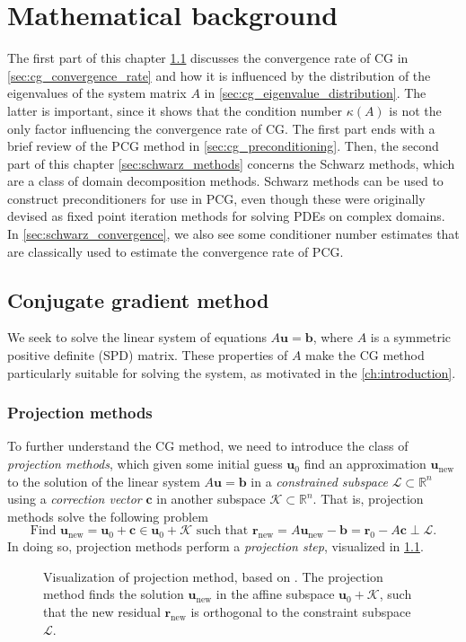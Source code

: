 \chapter{Mathematical background}\label{ch:background}
The first part of this chapter \cref{sec:cg_method} discusses the convergence rate of CG in \cref{sec:cg_convergence_rate} and how it is influenced by the distribution of the eigenvalues of the system matrix $A$ in \cref{sec:cg_eigenvalue_distribution}. The latter is important, since it shows that the condition number $\kappa(A)$ is not the only factor influencing the convergence rate of CG. The first part ends with a brief review of the PCG method in \cref{sec:cg_preconditioning}. Then, the second part of this chapter \cref{sec:schwarz_methods} concerns the Schwarz methods, which are a class of domain decomposition methods. Schwarz methods can be used to construct preconditioners for use in PCG, even though these were originally devised as fixed point iteration methods for solving PDEs on complex domains. In \cref{sec:schwarz_convergence}, we also see some conditioner number estimates that are classically used to estimate the convergence rate of PCG.

\section{Conjugate gradient method}\label{sec:cg_method}
We seek to solve the linear system of equations $A\mathbf{u} = \mathbf{b}$, where $A$ is a symmetric positive definite (SPD) matrix. These properties of $A$ make the CG method particularly suitable for solving the system, as motivated in the \cref{ch:introduction}.

\subsection{Projection methods}
To further understand the CG method, we need to introduce the class of \textit{projection methods}, which given some initial guess $\mathbf{u}_0$ find an approximation $\mathbf{u}_{\text{new}}$ to the solution of the linear system $A\mathbf{u} = \mathbf{b}$ in a \textit{constrained subspace} $\mathcal{L}\subset\mathbb{R}^n$ using a \textit{correction vector} $\mathbf{c}$ in another subspace $\mathcal{K}\subset\mathbb{R}^n$. That is, projection methods solve the following problem \cite[Equation 5.3]{iter_method_saad}
\[
  \text{Find } \mathbf{u}_{\text{new}} = \mathbf{u}_0 + \mathbf{c} \in \mathbf{u}_0 + \mathcal{K} \text{ such that } \mathbf{r}_{\text{new}} =  A\mathbf{u}_{\text{new}} - \mathbf{b} = \mathbf{r}_0 - A\mathbf{c} \perp \mathcal{L}.
\]
In doing so, projection methods perform a \textit{projection step}, visualized in \cref{fig:projection_method}.
\begin{figure}[H]
  \centering
  
  \caption{Visualization of projection method, based on \cite[Figure 5.1]{iter_method_saad}. The projection method finds the solution $\mathbf{u}_{\text{new}}$ in the affine subspace $\mathbf{u}_0 + \mathcal{K}$, such that the new residual $\mathbf{r}_{\text{new}}$ is orthogonal to the constraint subspace $\mathcal{L}$.}
  \label{fig:projection_method}
\end{figure}

